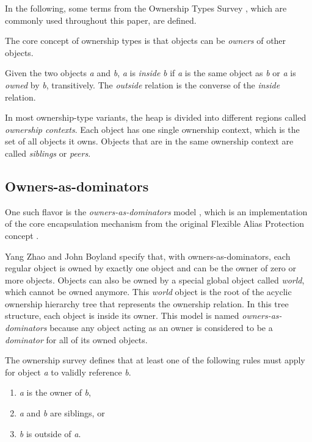 \documentclass[sigplan,11pt,nonacm]{acmart}
\begin{document}
In the following, some terms from the Ownership Types Survey \cite{ownership-types-survey}, which are commonly used throughout this paper, are defined.

The core concept of ownership types is that objects can be \emph{owners} of other objects.

Given the two objects \emph{a} and \emph{b}, \emph{a} is \emph{inside} \emph{b} if \emph{a} is the same object as \emph{b} or \emph{a} is \emph{owned} by \emph{b}, transitively.
The \emph{outside} relation is the converse of the \emph{inside} relation.

In most ownership-type variants, the heap is divided into different regions called \emph{ownership contexts}.
Each object has one single ownership context, which is the set of all objects it owns.
Objects that are in the same ownership context are called \emph{siblings} or \emph{peers}.


\subsection{Owners-as-dominators}
\label{sec:owners-as-dominators}

One such flavor is the \emph{owners-as-dominators} model \cite{ownership-types-survey}, which is an implementation of the core encapsulation mechanism from the original Flexible Alias Protection concept \cite{flexible-alias-protection}.

Yang Zhao and John Boyland \cite{permission-ownership-types} specify that, with owners-as-dominators, each regular object is owned by exactly one object and can be the owner of zero or more objects.
Objects can also be owned by a special global object called \emph{world}, which cannot be owned anymore.
This \emph{world} object is the root of the acyclic ownership hierarchy tree that represents the ownership relation.
In this tree structure, each object is inside its owner.
This model is named \emph{owners-as-dominators} because any object acting as an owner is considered to be a \emph{dominator} for all of its owned objects.

The ownership survey \cite{ownership-types-survey} defines that at least one of the following rules must apply for object \emph{a} to validly reference \emph{b}.
\begin{enumerate}
  \item \emph{a} is the owner of \emph{b},
  \item \emph{a} and \emph{b} are siblings, or
  \item \emph{b} is outside of \emph{a}.
\end{enumerate}
\end{document}
